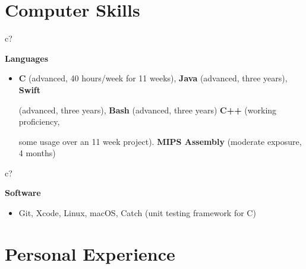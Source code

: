 \documentclass[12pt,a4paper,sans]{moderncv} %
\begin{document}
\vspace{-4 mm}
\section{Computer Skills}


 \hspace{24.5 mm}
\begin{tabular}{c?}
 \\
\end{tabular}
 \hspace{2 mm}
 \textbf{Languages}
 
\begin{itemize}
\addtolength{\itemindent}{31.7 mm}
\item \textbf{C} (advanced, 40 hours/week for 11 weeks), \textbf{Java} (advanced, three years), \textbf{Swift} 

   \hspace{30.5 mm}  (advanced, three years), \textbf{Bash} (advanced, three years) \textbf{C++} (working proficiency,  
   
      \hspace{30.5 mm} some usage over an 11 week project). \textbf{MIPS Assembly} (moderate exposure, 4 months)
\end{itemize}


 \hspace{24.5 mm}
\begin{tabular}{c?}
 \\
\end{tabular}
 \hspace{2 mm}
 \textbf{Software}
 
\begin{itemize}
\addtolength{\itemindent}{31.7 mm}
\item{Git, Xcode, Linux, macOS, Catch (unit testing framework for C)}

 \hspace{30.5 mm}
\end{itemize}




\vspace{-9 mm}
\section{Personal Experience}
\end{document}
